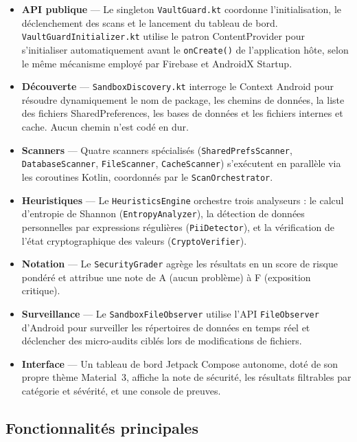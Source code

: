 \documentclass[preprint,12pt, a4paper]{elsarticle}
\begin{document}
\begin{itemize}
    \item \textbf{API publique} — Le singleton \texttt{VaultGuard.kt} coordonne l'initialisation, le déclenchement des scans et le lancement du tableau de bord. \texttt{VaultGuardInitializer.kt} utilise le patron ContentProvider pour s'initialiser automatiquement avant le \texttt{onCreate()} de l'application hôte, selon le même mécanisme employé par Firebase et AndroidX Startup.

    \item \textbf{Découverte} — \texttt{SandboxDiscovery.kt} interroge le Context Android pour résoudre dynamiquement le nom de package, les chemins de données, la liste des fichiers SharedPreferences, les bases de données et les fichiers internes et cache. Aucun chemin n'est codé en dur.

    \item \textbf{Scanners} — Quatre scanners spécialisés (\texttt{SharedPrefsScanner}, \texttt{DatabaseScanner}, \texttt{FileScanner}, \texttt{CacheScanner}) s'exécutent en parallèle via les coroutines Kotlin, coordonnés par le \texttt{ScanOrchestrator}.

    \item \textbf{Heuristiques} — Le \texttt{HeuristicsEngine} orchestre trois analyseurs : le calcul d'entropie de Shannon (\texttt{EntropyAnalyzer}), la détection de données personnelles par expressions régulières (\texttt{PiiDetector}), et la vérification de l'état cryptographique des valeurs (\texttt{CryptoVerifier}).

    \item \textbf{Notation} — Le \texttt{SecurityGrader} agrège les résultats en un score de risque pondéré et attribue une note de A (aucun problème) à F (exposition critique).

    \item \textbf{Surveillance} — Le \texttt{SandboxFileObserver} utilise l'API \texttt{FileObserver} d'Android pour surveiller les répertoires de données en temps réel et déclencher des micro-audits ciblés lors de modifications de fichiers.

    \item \textbf{Interface} — Un tableau de bord Jetpack Compose autonome, doté de son propre thème Material~3, affiche la note de sécurité, les résultats filtrables par catégorie et sévérité, et une console de preuves.
\end{itemize}

\subsection{Fonctionnalités principales}
\end{document}
